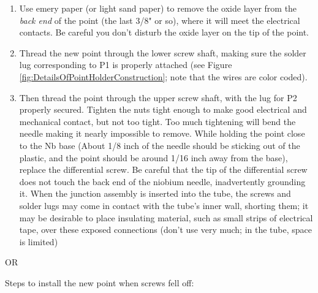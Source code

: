 \documentclass{../lab}
\begin{document}
\begin{enumerate}
    \item Use emery paper (or light sand paper) to remove the oxide layer from the \emph{back end }of the point (the last 3/8" or so), where it will meet the electrical contacts. Be careful you don't disturb the oxide layer on the tip of the point.

    \item Thread the new point through the lower screw shaft, making sure the solder lug corresponding to P1 is properly attached (see Figure \ref{fig:DetailsOfPointHolderConstruction}; note that the wires are color coded).

    \item Then thread the point through the upper screw shaft, with the lug for P2 properly secured. Tighten the nuts tight enough to make good electrical and mechanical contact, but not too tight. Too much tightening will bend the needle making it nearly impossible to remove. While holding the point close to the Nb base (About 1/8 inch of the needle should be sticking out of the plastic, and the point should be around 1/16 inch away from the base), replace the differential screw. Be careful that the tip of the differential screw does not touch the back end of the niobium needle, inadvertently grounding it. When the junction assembly is inserted into the tube, the screws and solder lugs may come in contact with the tube's inner wall, shorting them; it may be desirable to place insulating material, such as small strips of electrical tape, over these exposed connections (don't use very much; in the tube, space is limited)

\end{enumerate}

\noindent OR

\noindent Steps to install the new point when screws fell off:
\end{document}
